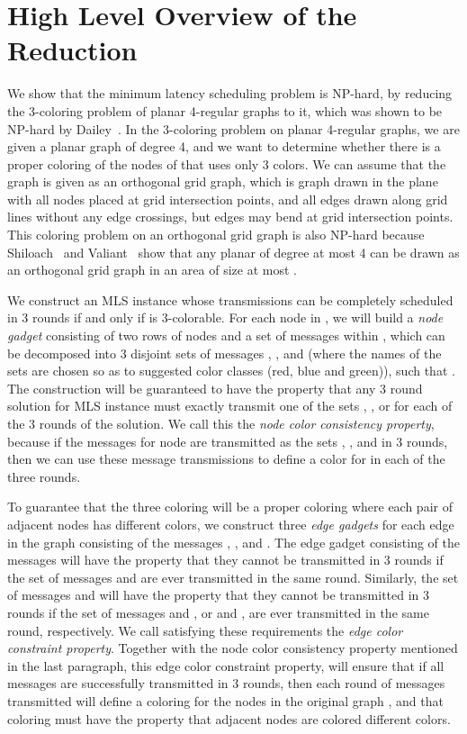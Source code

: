 \documentclass{article}
\begin{document}
\section{High Level Overview of the Reduction}
\label{sec:highlevel}
We show that the minimum latency scheduling problem is NP-hard, by reducing the 3-coloring problem of planar 4-regular graphs to it, which was shown to be NP-hard by Dailey~\cite{Dailey1980289}.  In the 3-coloring problem on planar 4-regular graphs, we are given a planar graph  of degree 4, and we want to determine whether there is a proper coloring of the nodes of  that uses only 3 colors.  We can assume that the graph is given as an orthogonal grid graph, which is graph drawn in the plane with all nodes placed at grid intersection points, and all edges drawn along grid lines without any edge crossings, but edges may bend at grid intersection points.   This coloring problem on an orthogonal grid graph is also NP-hard because Shiloach~\cite{Shiloach} and Valiant~\cite{Valiant} show that any planar  of degree at most 4 can be drawn as an orthogonal grid graph in an area of size at most .


We construct an MLS instance whose transmissions can be completely scheduled in 3 rounds if and only if  is 3-colorable.
For each node  in , we will build a \emph{node gadget} consisting of two rows of nodes  and a set of messages  within , which can be decomposed into 3 disjoint sets of messages , , and  (where the names of the sets are chosen so as to suggested color classes (red, blue and green)), such that .  The construction will be guaranteed to have the property that any 3 round solution for MLS instance must exactly transmit one of the sets , , or  for each of the 3 rounds of the solution.  We call this the \emph{node color consistency property},  because if the messages for node  are transmitted as the sets , , and  in 3 rounds, then we can use these message transmissions to define a color for  in each of the three rounds.

To guarantee that the three coloring will be a proper coloring where each pair of adjacent nodes has different colors, we construct three \emph{edge gadgets} for each edge  in the graph consisting of the messages , , and .  The edge gadget consisting of the messages  will have the property that they cannot be transmitted in 3 rounds if the set of messages  and  are ever transmitted in the same round.  Similarly, the set of messages  and  will have the property that they cannot be transmitted in 3 rounds if the set of messages  and , or  and , are ever transmitted in the same round, respectively.  We call satisfying these requirements the \emph{edge color constraint property}.  Together with the node color consistency property mentioned in the last paragraph, this edge color constraint property, will ensure that if all messages are successfully transmitted in 3 rounds, then each round of messages transmitted will define a coloring for the nodes in the original graph , and that coloring must have the property that adjacent nodes are colored different colors.
\end{document}
